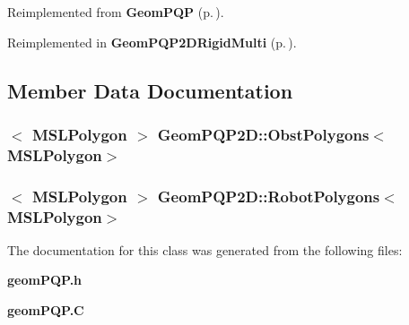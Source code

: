 Reimplemented from {\bf Geom\-PQP} {\rm (p.\,\pageref{classGeomPQP_a3})}.

Reimplemented in {\bf Geom\-PQP2DRigid\-Multi} {\rm (p.\,\pageref{classGeomPQP2DRigidMulti_a4})}.

\subsection{Member Data Documentation}
\subsubsection{$<$ {\bf MSLPolygon} $>$ Geom\-PQP2D::Obst\-Polygons$<${\bf MSLPolygon}$>$}\label{classGeomPQP2D_m0}


\subsubsection{$<$ {\bf MSLPolygon} $>$ Geom\-PQP2D::Robot\-Polygons$<${\bf MSLPolygon}$>$}\label{classGeomPQP2D_m1}




The documentation for this class was generated from the following files:\begin{CompactItemize}
\item 
{\bf geom\-PQP.h}\item 
{\bf geom\-PQP.C}\end{CompactItemize}
